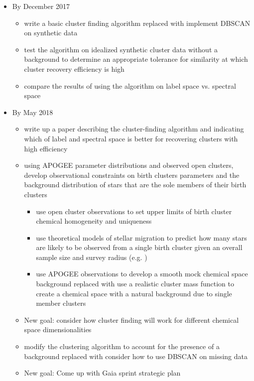 \documentclass[11pt]{article}
\begin{document}
    
    \begin{itemize}
		\item By December 2017
		\begin{itemize} 
		\item {\color{BurntOrange} write a basic cluster finding algorithm} replaced with {\color{RoyalBlue} implement DBSCAN on synthetic data}
		\item {\color{RoyalBlue} test the algorithm on idealized synthetic cluster data without a background to determine an appropriate tolerance for similarity at which cluster recovery efficiency is high}
		\item {\color{RoyalBlue} compare the results of using the algorithm on label space vs. spectral space}
		\end{itemize}
		\item By May 2018
		\begin{itemize}
		\item {\color{ForestGreen} write up a paper describing the cluster-finding algorithm and indicating which of label and spectral space is better for recovering clusters with high efficiency}
		\item {\color{RoyalBlue}using APOGEE parameter distributions and observed open clusters, develop observational constraints on birth clusters parameters and the background distribution of stars that are the sole members of their birth clusters}
		\begin{itemize}
		\item {\color{ForestGreen} use open cluster observations to set upper limits of birth cluster chemical homogeneity and uniqueness}
		\item use theoretical models of stellar migration to predict how many stars are likely to be observed from a single birth cluster given an overall sample size and survey radius (e.g. \citealt{Ting2015a})
		\item {\color{BurntOrange} use APOGEE observations to develop a smooth mock chemical space background} replaced with {\color{RoyalBlue} use a realistic cluster mass function to create a chemical space with a natural background due to single member clusters}
		\end{itemize}
		\item New goal: {\color{ForestGreen} consider how cluster finding will work for different chemical space dimensionalities}
		\item {\color{BurntOrange} modify the clustering algorithm to account for the presence of a background} replaced with {\color{ForestGreen} consider how to use DBSCAN on missing data}
		\item New goal: {\color{RoyalBlue}Come up with Gaia sprint strategic plan}
		\end{itemize}
	\end{itemize}
    
\end{document}

